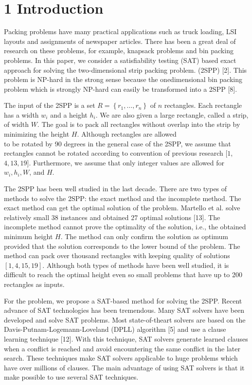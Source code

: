 \documentclass[10pt]{article}
\begin{document}
\section*{1 Introduction}
Packing problems have many practical applications such as truck loading, LSI layouts and assignments of newspaper articles. There has been a great deal of research on these problems, for example, knapsack problems and bin packing problems. In this paper, we consider a satisfiability testing (SAT) based exact approach for solving the two-dimensional strip packing problem. (2SPP) [2]. This problem is NP-hard in the strong sense because the onedimensional bin packing problem which is strongly NP-hard can easily be transformed into a 2SPP [8].

The input of the 2SPP is a set $R=\left\{r_{1}, \ldots, r_{n}\right\}$ of $n$ rectangles. Each rectangle has a width $w_{i}$ and a height $h_{i}$. We are also given a large rectangle, called a strip, of width $W$. The goal is to pack all rectangles without overlap into the strip by minimizing the height $H$. Although rectangles are allowed\\
to be rotated by 90 degrees in the general case of the 2SPP, we assume that rectangles cannot be rotated according to convention of previous research $[1$, $4,13,19]$. Furthermore, we assume that only integer values are allowed for $w_{i}, h_{i}, W$, and $H$.

The 2SPP has been well studied in the last decade. There are two types of methods to solve the 2SPP: the exact method and the incomplete method. The exact method can get the optimal solution of the problem. Martello et al. solve relatively small 38 instances and obtained 27 optimal solutions [13]. The incomplete method cannot prove the optimality of the solution, i.e., the obtained minimum height $H$. The method can only confirm the solution as optimum provided that the solution corresponds to the lower bound of the problem. The method can pack over thousand rectangles with keeping quality of solutions $[1,4,15,19]$. Although both types of methods have been well studied, it is difficult to reach the optimal height even so small problems that have up to 200 rectangles as inputs.

For the problem, we propose a SAT-based method for solving the 2SPP. Recent advance of SAT technologies has been tremendous. Many SAT solvers have been developed and solve SAT problems. Most state-of-theart solvers are based on the Davis-Putnam-Logemann-Loveland (DPLL) algorithm [5] and use a clause learning technique [12]. With this technique, SAT solvers generate learned clauses when a conflict is reached and avoid encountering the same conflict in the later search. These techniques make SAT solvers applicable to huge problems which have over millions of clauses. The main advantage of using SAT solvers is that it make possible to use several SAT techniques.
\end{document}
